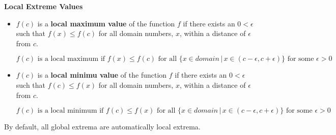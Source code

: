 \documentclass{ximera}
\begin{document}
\begin{definition} \textbf{\textcolor{green!50!black}{Local Extreme Values}} 
\begin{itemize}
\item $f(c)$ is a \textbf{local maximum value} of the function $f$ if there exists an $0 < \epsilon$ such that $f(x) \leq f(c)$ for all domain numbers, $x$, within a distance of $\epsilon$ from $c$. 

\[  f(c) \text{ is a local maximum if } f(x) \leq f(c) \text{ for all } \{ x \in domain \, | \, x \in (c - \epsilon, c + \epsilon) \} \text{ for some } \epsilon > 0 \]







\item $f(c)$ is a \textbf{local minimu value} of the function $f$ if there exists an $0 < \epsilon$ such that $f(c) \leq f(x)$ for all domain numbers, $x$, within a distance of $\epsilon$ from $c$. 



\[  f(c) \text{ is a local minimum if } f(c) \leq f(x) \text{ for all } \{ x \in domain \, | \, x \in (c - \epsilon, c + \epsilon) \} \text{ for some } \epsilon > 0 \]
\end{itemize}

\end{definition}





By default, all global extrema are automatically local extrema.
\end{document}
